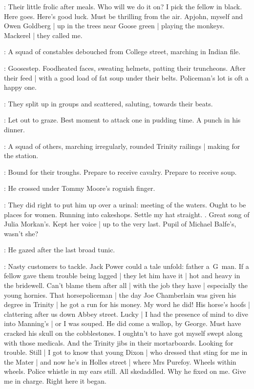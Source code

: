 \BloomInt:
Their little frolic after meals.
Who will we do it on?
I pick the fellow in black.
Here goes.
Here's good luck.
Must be thrilling from the air.
Apjohn, myself and Owen Goldberg |
up in the trees near Goose green |
playing the monkeys.
Mackerel |
they called me.

:
A squad of constables debouched from College street,
marching in Indian file.

\BloomInt:
Goosestep.
Foodheated faces,
sweating helmets,
patting their truncheons.
After their feed |
with a good load of fat soup under their belts.
Policeman's lot is oft a happy one.

:
They split up in groups and scattered,
saluting,
towards their beats.

\BloomInt:
Let out to graze.
Best moment to attack one in pudding time.
A punch in his dinner.

:
A squad of others,
marching irregularly,
rounded Trinity railings |
making for the station.

\BloomInt:
Bound for their troughs.
Prepare to receive cavalry.
Prepare to receive soup.

:
He crossed under Tommy Moore's roguish finger.

\BloomInt:
They did right to put him up over a urinal:
meeting of the waters.
Ought to be places for women.
Running into cakeshops.
Settle my hat straight.
.
Great song of Julia Morkan's.
Kept her voice |
up to the very last.
Pupil of Michael Balfe's,
wasn't she?

:
He gazed after the last broad tunic.

\BloomInt:
Nasty customers to tackle.
Jack Power could a tale unfold:
father a~G~man.
If a fellow gave them trouble being lagged |
they let him have it |
hot and heavy in the bridewell.
Can't blame them after all |
with the job they have |
especially the young hornies.
That horsepoliceman |
the day Joe Chamberlain was given his degree in Trinity |
he got a run for his money.
My word he did!
His horse's hoofs |
clattering after us down Abbey street.
Lucky |
I had the presence of mind to dive into Manning's |
or I was souped.
He did come a wallop,
by George.
Must have cracked his skull on the cobblestones.
I oughtn't to have got myself swept along with those medicals.
And the Trinity jibs in their mortarboards.
Looking for trouble.
Still |
I got to know that young Dixon |
who dressed that sting for me in the Mater |
and now he's in Holles street |
where Mrs Purefoy.
Wheels within wheels.
Police whistle in my ears still.
All skedaddled.
Why he fixed on me.
Give me in charge.
Right here it began.

